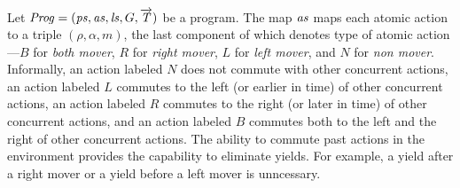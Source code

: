 Let $\mathit{Prog} = (\mathit{ps}, \mathit{as}, \mathit{ls}, G, \overrightarrow{\mathit{T}})$ be a program.
The map $\mathit{as}$ maps each atomic action to a triple $(\rho, \alpha, m)$, the last component of which 
denotes type of atomic action---$B$ for {\em both mover}, $R$ for {\em right mover}, $L$ for {\em left mover},
and $N$ for {\em non mover}.
Informally, an action labeled $N$ does not commute with other concurrent actions,
an action labeled $L$ commutes to the left (or earlier in time) of other concurrent actions,
an action labeled $R$ commutes to the right (or later in time) of other concurrent actions,
and an action labeled $B$ commutes both to the left and the right of other concurrent actions.
The ability to commute past actions in the environment provides the capability to eliminate yields.
For example, a yield after a right mover or a yield before a left mover is unncessary.


